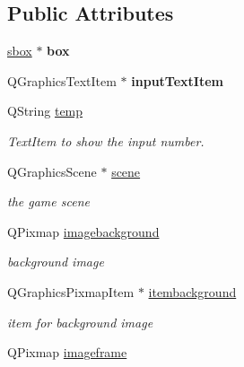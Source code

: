 \subsection*{\-Public \-Attributes}
\begin{DoxyCompactItemize}
\item 
\hypertarget{classgamemanager5_a3e8dadd15d321add4ce196dc2af064ef}{\hyperlink{classsbox}{sbox} $\ast$ {\bfseries box}}\label{classgamemanager5_a3e8dadd15d321add4ce196dc2af064ef}

\item 
\hypertarget{classgamemanager5_a1ef25266ffa7161d06ac178c07bb587f}{\-Q\-Graphics\-Text\-Item $\ast$ {\bfseries input\-Text\-Item}}\label{classgamemanager5_a1ef25266ffa7161d06ac178c07bb587f}

\item 
\-Q\-String \hyperlink{classgamemanager5_ab171ceb12e75ddc1edf4369ca3edbfff}{temp}
\begin{DoxyCompactList}\small\item\em \-Text\-Item to show the input number. \end{DoxyCompactList}\item 
\hypertarget{classgamemanager5_a532d4fe5a6475f499c5c084038171ec6}{\-Q\-Graphics\-Scene $\ast$ \hyperlink{classgamemanager5_a532d4fe5a6475f499c5c084038171ec6}{scene}}\label{classgamemanager5_a532d4fe5a6475f499c5c084038171ec6}

\begin{DoxyCompactList}\small\item\em the game scene \end{DoxyCompactList}\item 
\hypertarget{classgamemanager5_a1dff49eff7b1dc7b0a260afb03a2b8cd}{\-Q\-Pixmap \hyperlink{classgamemanager5_a1dff49eff7b1dc7b0a260afb03a2b8cd}{imagebackground}}\label{classgamemanager5_a1dff49eff7b1dc7b0a260afb03a2b8cd}

\begin{DoxyCompactList}\small\item\em background image \end{DoxyCompactList}\item 
\hypertarget{classgamemanager5_a7e1d78b7a4ada58e1662f37a41a1000c}{\-Q\-Graphics\-Pixmap\-Item $\ast$ \hyperlink{classgamemanager5_a7e1d78b7a4ada58e1662f37a41a1000c}{itembackground}}\label{classgamemanager5_a7e1d78b7a4ada58e1662f37a41a1000c}

\begin{DoxyCompactList}\small\item\em item for background image \end{DoxyCompactList}\item 
\hypertarget{classgamemanager5_aa41b38bc084ffbfd38193552311d00c5}{\-Q\-Pixmap \hyperlink{classgamemanager5_aa41b38bc084ffbfd38193552311d00c5}{imageframe}}\label{classgamemanager5_aa41b38bc084ffbfd38193552311d00c5}


\end{DoxyCompactItemize}
